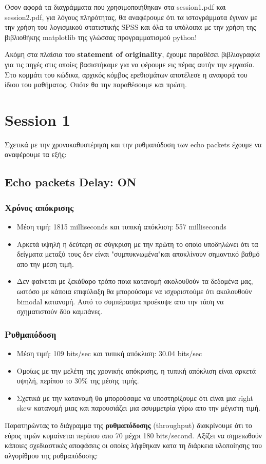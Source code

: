 \documentclass[hidelinks, 12pt, a4paper]{article}
\begin{document}
Όσον αφορά τα διαγράμματα που χρησιμοποιήθηκαν στα session1.pdf και session2.pdf, για λόγους πληρότητας, θα αναφέρουμε ότι τα ιστογράμματα έγιναν με την χρήση του λογισμικού στατιστικής SPSS και όλα τα υπόλοιπα με την χρήση της βιβλιοθήκης matplotlib της γλώσσας προγραμματισμού python! 

Ακόμη στα πλαίσια του \textbf{statement of originality}, έχουμε παραθέσει βιβλιογραφία για τις πηγές στις οποίες βασιστήκαμε για να φέρουμε εις πέρας αυτήν την εργασία. Στο κομμάτι του κώδικα, αρχικός κόμβος ερεθισμάτων αποτέλεσε η αναφορά του ίδιου του μαθήματος. Οπότε θα την παραθέσουμε και πρώτη\cite{ergasia2}.
\section{Session 1}


Σχετικά με την χρονοκαθυστέρηση και την ρυθμαπόδοση των echo packets έχουμε να αναφέρουμε τα εξής:

\subsection{Echo packets Delay: ON}

\subsubsection{Χρόνος απόκρισης}
\begin{itemize}
    \item Μέση τιμή: 1815 milliseconds και τυπική απόκλιση: 557 milliseconds
    \item Αρκετά υψηλή η δεύτερη σε σύγκριση με την πρώτη το οποίο υποδηλώνει ότι τα δείγματα μεταξύ τους δεν είναι "συμπυκνωμένα"και αποκλίνουν σημαντικό βαθμό απο την μέση τιμή.
    \item Δεν φαίνεται με ξεκάθαρο τρόπο ποια κατανομή ακολουθούν τα δεδομένα μας, ωστόσο με κάποια επιφύλαξη θα μπορούσαμε να ισχυριστούμε ότι ακολουθούν bimodal κατανομή. Αυτό το συμπέρασμα προέκυψε απο την τάση να σχηματιστούν δύο καμπάνες.
\end{itemize}

\subsubsection{Ρυθμαπόδοση}

\begin{itemize}
    \item Μέση τιμή: 109 bits/sec και τυπική απόκλιση: 30.04 bits/sec
    \item Ομοίως με την μελέτη της χρονικής απόκρισης, η τυπική απόκλιση είναι αρκετά υψηλή, περίπου το 30\% της μέσης τιμής.
    \item Σχετικά με την κατανομή θα μπορούσαμε να υποστηρίξουμε ότι είναι μια right skew κατανομή μιας και παρουσιάζει μια ασυμμετρία γύρω απο την μέγιστη τιμή.
\end{itemize}
Παρατηρώντας το διάγραμμα της \textbf{ρυθμαπόδοσης} (throughput) διακρίνουμε ότι το εύρος τιμών κυμαίνεται περίπου απο 70 μέχρι 180 bits/second. Αξίζει να σημειωθούν κάποιες σχεδιαστικές αποφάσεις οι οποίες λήφθηκαν κατα τη διάρκεια υλοποίησης του αλγορίθμου της ρυθμαπόδοσης:
\end{document}
